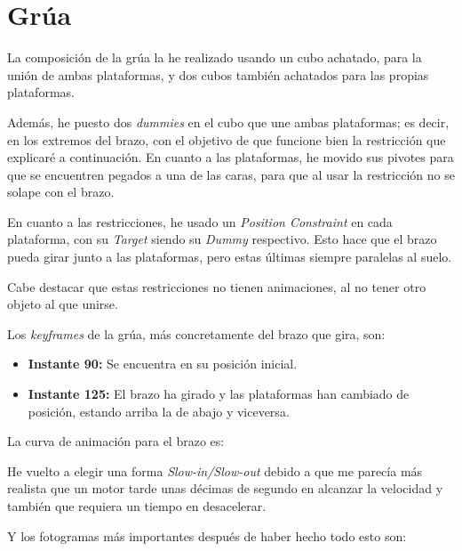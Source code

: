 \section{Grúa}

La composición de la grúa la he realizado usando un cubo achatado, para la unión de ambas plataformas, y dos cubos también achatados para las propias plataformas.

\bigskip

Además, he puesto dos \textit{dummies} en el cubo que une ambas plataformas; es decir, en los extremos del brazo, con el objetivo de que funcione bien la restricción que explicaré a continuación. En cuanto a las plataformas, he movido sus pivotes para que se encuentren pegados a una de las caras, para que al usar la restricción no se solape con el brazo.

\bigskip

En cuanto a las restricciones, he usado un \textit{Position Constraint} en cada plataforma, con su \textit{Target} siendo su \textit{Dummy} respectivo. Esto hace que el brazo pueda girar junto a las plataformas, pero estas últimas siempre paralelas al suelo.

\bigskip

Cabe destacar que estas restricciones no tienen animaciones, al no tener otro objeto al que unirse.



Los \textit{keyframes} de la grúa, más concretamente del brazo que gira, son:

\begin{itemize}
    \item \textbf{Instante 90: }Se encuentra en su posición inicial.
    \item \textbf{Instante 125: }El brazo ha girado y las plataformas han cambiado de posición, estando arriba la de abajo y viceversa.
\end{itemize}

\bigskip

La curva de animación para el brazo es:



He vuelto a elegir una forma \textit{Slow-in/Slow-out} debido a que me parecía más realista que un motor tarde unas décimas de segundo en alcanzar la velocidad y también que requiera un tiempo en desacelerar.

\bigskip

Y los fotogramas más importantes después de haber hecho todo esto son:

